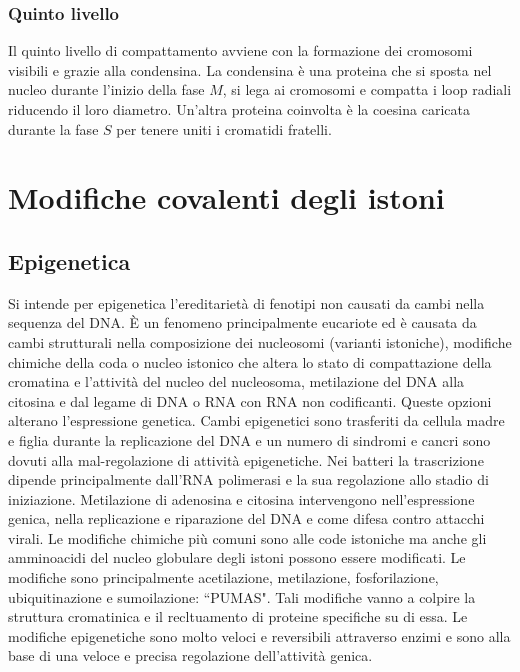 \subsubsection{Quinto livello}
Il quinto livello di compattamento avviene con la formazione dei cromosomi visibili e grazie alla condensina. La condensina \`e una proteina che si sposta nel nucleo durante l'inizio 
della fase $M$, si lega ai cromosomi e compatta i loop radiali riducendo il loro diametro. Un'altra proteina coinvolta \`e la coesina caricata durante la fase $S$ per tenere uniti i 
cromatidi fratelli. 
\section{Modifiche covalenti degli istoni}
\subsection{Epigenetica}
Si intende per epigenetica l'ereditariet\`a di fenotipi non causati da cambi nella sequenza del DNA. \`E un fenomeno principalmente eucariote ed \`e causata da cambi strutturali
nella composizione dei nucleosomi (varianti istoniche), modifiche chimiche della coda o nucleo istonico che altera lo stato di compattazione della cromatina e l'attivit\`a del nucleo
del nucleosoma, metilazione del DNA alla citosina e dal legame di DNA o RNA con RNA non codificanti. Queste opzioni alterano l'espressione genetica. Cambi epigenetici sono 
trasferiti da cellula madre e figlia durante la replicazione del DNA e un numero di sindromi e cancri sono dovuti alla mal-regolazione di attivit\`a epigenetiche. Nei batteri la
trascrizione dipende principalmente dall'RNA polimerasi e la sua regolazione allo stadio di iniziazione. Metilazione di adenosina e citosina intervengono nell'espressione genica, 
nella replicazione e riparazione del DNA e come difesa contro attacchi virali. Le modifiche chimiche pi\`u comuni sono alle code istoniche ma anche gli amminoacidi del nucleo globulare 
degli istoni possono essere modificati. Le modifiche sono principalmente acetilazione, metilazione, fosforilazione, ubiquitinazione e sumoilazione: ``PUMAS". Tali modifiche vanno a 
colpire la struttura cromatinica e il recltuamento di proteine specifiche su di essa. Le modifiche epigenetiche sono molto veloci e reversibili attraverso enzimi e sono alla base di
una veloce e precisa regolazione dell'attivit\`a genica. 
